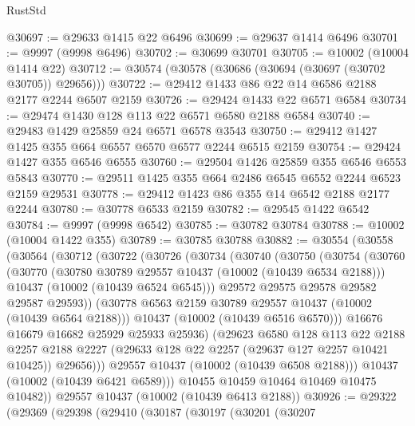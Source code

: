 \begin{lexlean}{RustStd}
\begin{coremodule}
@30697 := @29633 @1415 @22 @6496
@30699 := @29637 @1414 @6496
@30701 := @9997 (@9998 @6496)
@30702 := @30699 @30701
@30705 := @10002 (@10004 @1414 @22)
@30712 := @30574 (@30578 (@30686 (@30694 (@30697 (@30702 @30705)) @29656)))
@30722 := @29412 @1433 @86 @22 @14 @6586 @2188 @2177 @2244 @6507 @2159
@30726 := @29424 @1433 @22 @6571 @6584
@30734 := @29474 @1430 @128 @113 @22 @6571 @6580 @2188 @6584
@30740 := @29483 @1429 @25859 @24 @6571 @6578 @3543
@30750 := @29412 @1427 @1425 @355 @664 @6557 @6570 @6577 @2244 @6515 @2159
@30754 := @29424 @1427 @355 @6546 @6555
@30760 := @29504 @1426 @25859 @355 @6546 @6553 @5843
@30770 := @29511 @1425 @355 @664 @2486 @6545 @6552 @2244 @6523 @2159 @29531
@30778 := @29412 @1423 @86 @355 @14 @6542 @2188 @2177 @2244
@30780 := @30778 @6533 @2159
@30782 := @29545 @1422 @6542
@30784 := @9997 (@9998 @6542)
@30785 := @30782 @30784
@30788 := @10002 (@10004 @1422 @355)
@30789 := @30785 @30788
@30882 := @30554
    (@30558
      (@30564
        (@30712
          (@30722
            (@30726
              (@30734
                (@30740
                  (@30750
                    (@30754
                      (@30760
                        (@30770
                          (@30780 @30789 @29557 @10437 (@10002 (@10439 @6534 @2188)))
                          @10437
                          (@10002 (@10439 @6524 @6545)))
                        @29572
                        @29575
                        @29578
                        @29582
                        @29587
                        @29593))
                    (@30778 @6563 @2159 @30789 @29557 @10437 (@10002 (@10439 @6564 @2188)))
                    @10437
                    (@10002 (@10439 @6516 @6570)))
                  @16676
                  @16679
                  @16682
                  @25929
                  @25933
                  @25936)
                (@29623
                  @6580
                  @128
                  @113
                  @22
                  @2188
                  @2257
                  @2188
                  @2227
                  (@29633 @128 @22 @2257 (@29637 @127 @2257 @10421 @10425))
                  @29656)))
            @29557
            @10437
            (@10002 (@10439 @6508 @2188)))
          @10437
          (@10002 (@10439 @6421 @6589)))
        @10455
        @10459
        @10464
        @10469
        @10475
        @10482))
    @29557
    @10437
    (@10002 (@10439 @6413 @2188))
@30926 := @29322
    (@29369
      (@29398
        (@29410
          (@30187
            (@30197
              (@30201
                (@30207

\end{coremodule}
\end{lexlean}
